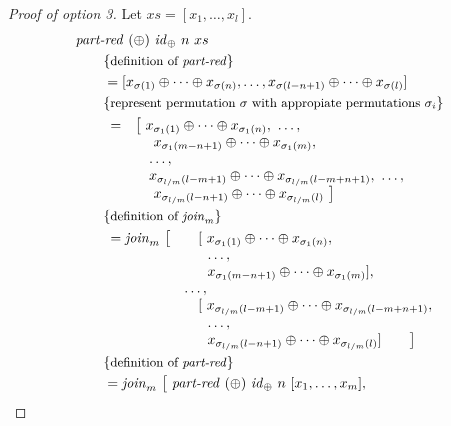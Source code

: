 \begin{proof}[Proof of option 3]
  Let $xs = [x_1, \ldots, x_l]$.
  \begin{align*}
    &\partRed\ (\oplus)\ \id_\oplus\ n\ xs\\
    &\qquad \comment{definition of \partRed}\\
    &\qquad = [x_{\sigma(1)} \oplus \dots \oplus x_{\sigma(n)}, \ldots, x_{\sigma(l-n+1)} \oplus \dots \oplus x_{\sigma(l)}]\\
    &\qquad \comment{represent permutation $\sigma$ with appropiate permutations $\sigma_i$}\\
    &\qquad 
      \begin{array}{ll}
      = & \big[\ x_{\sigma_1(1)} \oplus \dots \oplus x_{\sigma_1(n)},\ \ldots,\\
        & \ \ \ \ x_{\sigma_1(m-n+1)} \oplus \dots \oplus x_{\sigma_1(m)},\\
        & \ \ \ \ldots,\\
        & \ \ \ x_{\sigma_{l/m}(l-m+1)} \oplus \dots \oplus x_{\sigma_{l/m}(l-m+n+1)},\ \ldots,\\
        & \ \ \ \ x_{\sigma_{l/m}(l-n+1)} \oplus \dots \oplus x_{\sigma_{l/m}(l)}\ \big]
      \end{array}\\
    &\qquad \comment{definition of $\join_m$}\\
    &\qquad
      \begin{array}{lll}
        = \join_m\ \big[&  &[\ x_{\sigma_1(1)} \oplus \dots \oplus x_{\sigma_1(n)},\\
             &  &\ \ \ldots,\\
             &  &\ \ x_{\sigma_1(m-n+1)} \oplus \dots \oplus x_{\sigma_1(m)}],\\
             &\multicolumn{2}{l}{\ldots,}\\
             &  &[\ x_{\sigma_{l/m}(l-m+1)} \oplus \dots \oplus x_{\sigma_{l/m}(l-m+n+1)},\\
             &  &\ \ \ldots,\\
             &  &\ \ x_{\sigma_{l/m}(l-n+1)} \oplus \dots \oplus x_{\sigma_{l/m}(l)}]\qquad\big]
      \end{array}\\
    &\qquad \comment{definition of \partRed}\\
    &\qquad = \join_m\
      \begin{aligned}[t]
        \big[\ &\partRed\ (\oplus)\ \id_\oplus\ n\ [x_1, \ldots, x_m],\\

\end{aligned}
\end{align*}
\end{proof}
